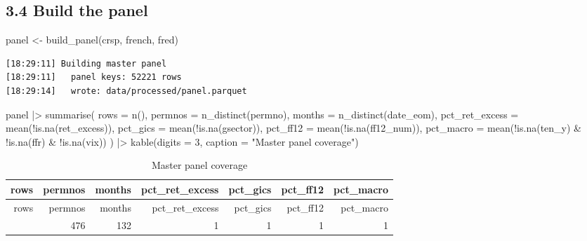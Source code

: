 \documentclass[
  letterpaper,
  DIV=11,
  numbers=noendperiod]{scrartcl}
\newenvironment{Shaded}{\begin{snugshade}}{\end{snugshade}}
\newcommand{\AttributeTok}[1]{\textcolor[rgb]{0.40,0.45,0.13}{#1}}
\newcommand{\DecValTok}[1]{\textcolor[rgb]{0.68,0.00,0.00}{#1}}
\newcommand{\FunctionTok}[1]{\textcolor[rgb]{0.28,0.35,0.67}{#1}}
\newcommand{\NormalTok}[1]{\textcolor[rgb]{0.00,0.23,0.31}{#1}}
\newcommand{\OtherTok}[1]{\textcolor[rgb]{0.00,0.23,0.31}{#1}}
\newcommand{\SpecialCharTok}[1]{\textcolor[rgb]{0.37,0.37,0.37}{#1}}
\newcommand{\StringTok}[1]{\textcolor[rgb]{0.13,0.47,0.30}{#1}}
\begin{document}
\subsection{3.4 Build the panel}\label{build-the-panel}

\begin{Shaded}
\begin{Highlighting}[]
\NormalTok{panel }\OtherTok{\textless{}{-}} \FunctionTok{build\_panel}\NormalTok{(crsp, french, fred)}
\end{Highlighting}
\end{Shaded}

\begin{verbatim}
[18:29:11] Building master panel
[18:29:11]   panel keys: 52221 rows
[18:29:14]   wrote: data/processed/panel.parquet
\end{verbatim}

\begin{Shaded}
\begin{Highlighting}[]
\NormalTok{panel }\SpecialCharTok{|\textgreater{}}
  \FunctionTok{summarise}\NormalTok{(}
    \AttributeTok{rows =} \FunctionTok{n}\NormalTok{(),}
    \AttributeTok{permnos =} \FunctionTok{n\_distinct}\NormalTok{(permno),}
    \AttributeTok{months  =} \FunctionTok{n\_distinct}\NormalTok{(date\_eom),}
    \AttributeTok{pct\_ret\_excess =} \FunctionTok{mean}\NormalTok{(}\SpecialCharTok{!}\FunctionTok{is.na}\NormalTok{(ret\_excess)),}
    \AttributeTok{pct\_gics       =} \FunctionTok{mean}\NormalTok{(}\SpecialCharTok{!}\FunctionTok{is.na}\NormalTok{(gsector)),}
    \AttributeTok{pct\_ff12       =} \FunctionTok{mean}\NormalTok{(}\SpecialCharTok{!}\FunctionTok{is.na}\NormalTok{(ff12\_num)),}
    \AttributeTok{pct\_macro      =} \FunctionTok{mean}\NormalTok{(}\SpecialCharTok{!}\FunctionTok{is.na}\NormalTok{(ten\_y) }\SpecialCharTok{\&} \SpecialCharTok{!}\FunctionTok{is.na}\NormalTok{(ffr) }\SpecialCharTok{\&} \SpecialCharTok{!}\FunctionTok{is.na}\NormalTok{(vix))}
\NormalTok{  ) }\SpecialCharTok{|\textgreater{}}
  \FunctionTok{kable}\NormalTok{(}\AttributeTok{digits =} \DecValTok{3}\NormalTok{, }\AttributeTok{caption =} \StringTok{"Master panel coverage"}\NormalTok{)}
\end{Highlighting}
\end{Shaded}

\begin{longtable}[]{@{}rrrrrrr@{}}
\caption{Master panel coverage}\tabularnewline
\toprule\noalign{}
rows & permnos & months & pct\_ret\_excess & pct\_gics & pct\_ff12 &
pct\_macro \\
\midrule\noalign{}
\endfirsthead
\toprule\noalign{}
rows & permnos & months & pct\_ret\_excess & pct\_gics & pct\_ff12 &
pct\_macro \\
\midrule\noalign{}
\endhead
\bottomrule\noalign{}
\endlastfoot
52221 & 476 & 132 & 1 & 1 & 1 & 1 \\
\end{longtable}
\end{document}

